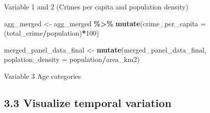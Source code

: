 \documentclass[
]{article}
\newenvironment{Shaded}{\begin{snugshade}}{\end{snugshade}}
\newcommand{\AttributeTok}[1]{\textcolor[rgb]{0.13,0.29,0.53}{#1}}
\newcommand{\DecValTok}[1]{\textcolor[rgb]{0.00,0.00,0.81}{#1}}
\newcommand{\FunctionTok}[1]{\textcolor[rgb]{0.13,0.29,0.53}{\textbf{#1}}}
\newcommand{\NormalTok}[1]{#1}
\newcommand{\OtherTok}[1]{\textcolor[rgb]{0.56,0.35,0.01}{#1}}
\newcommand{\SpecialCharTok}[1]{\textcolor[rgb]{0.81,0.36,0.00}{\textbf{#1}}}
\newcommand{\StringTok}[1]{\textcolor[rgb]{0.31,0.60,0.02}{#1}}
\begin{document}
Variable 1 and 2 (Crimes per capita and population density)

\begin{Shaded}
\begin{Highlighting}[]
\NormalTok{agg\_merged }\OtherTok{\textless{}{-}}\NormalTok{ agg\_merged }\SpecialCharTok{\%\textgreater{}\%}
  \FunctionTok{mutate}\NormalTok{(}\AttributeTok{crime\_per\_capita =}\NormalTok{ (total\_crime}\SpecialCharTok{/}\NormalTok{population)}\SpecialCharTok{*}\DecValTok{100}\NormalTok{)}

\NormalTok{merged\_panel\_data\_final }\OtherTok{\textless{}{-}} \FunctionTok{mutate}\NormalTok{(merged\_panel\_data\_final, }\AttributeTok{poplation\_density =}\NormalTok{ population}\SpecialCharTok{/}\NormalTok{area\_km2)}
\end{Highlighting}
\end{Shaded}

Variable 3 Age categories

\begin{Shaded}
\end{Shaded}

\subsection{3.3 Visualize temporal
variation}\label{visualize-temporal-variation}
\end{document}
